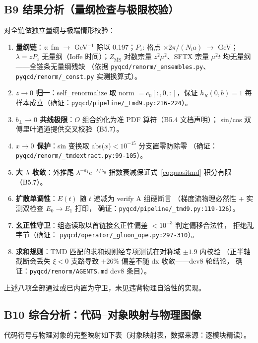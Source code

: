 \documentclass[UTF8]{ctexart}
\begin{document}
\subsection{B9 结果分析（量纲检查与极限校验）}
对全链做独立量纲与极端情形校验：
\begin{enumerate}
\item \textbf{量纲链}：$z$: fm $\to$ GeV$^{-1}$ 除以 0.197；$P_z$: 格点 $\times2\pi/(N_la)$
$\to$ GeV；$\lambda=zP_z$ 无量纲（Ioffe 时间）；$Z_{\overline{\mathrm{MS}}}$
对数宗量 $z^2\mu^2$、SFTX 宗量 $\mu^2t$ 均无量纲——全链条无量纲残缺
（依据 \texttt{\nolinkurl{pyqcd/renorm/_ensembles.py}}、
\texttt{\nolinkurl{pyqcd/renorm/_const.py}} 实测换算式）。
\item \textbf{$z\to0$ 归一}：self\_renormalize 取 norm $=c_0[:,0,:]$，保证
$h_R(0,b)=1$ 每样本成立（确证：\texttt{\nolinkurl{pyqcd/pipeline/_tmd9.py:216-224}}）。
\item \textbf{$b_\perp\to0$ 共线极限}：$O$ 组合约化为准 PDF 算符（B5.4 文档声明）；
sin/cos 双傅里叶通道提供交叉校验（B5.7）。
\item \textbf{$x\to0$ 保护}：sin 变换取 abs($x$)$<10^{-15}$ 分支置零防除零
（确证：\texttt{\nolinkurl{pyqcd/renorm/_tmdextract.py:99-105}}）。
\item \textbf{大 $\lambda$ 收敛}：外推尾 $\lambda^{-a_1}e^{-\lambda/\lambda_0}$
指数衰减保证式~\eqref{eq:quasitmd} 积分有限（B5.7）。
\item \textbf{扩散单调性}：$E(t)$ 随 $t$ 递减为 verify A 组硬断言
（梯度流物理必然性 + 实测双检查 $E_0\to E_1$ 打印，
确证：\texttt{\nolinkurl{pyqcd/pipeline/_tmd9.py:119-126}}）。
\item \textbf{幺正性守卫}：组态读取以首链接幺正性偏差 $<10^{-3}$ 判定偏移合法性，
拒绝乱字节（确证：
\texttt{\nolinkurl{pyqcd/operator/_gluon_ope.py:297-310}}）。
\item \textbf{求和规则}：TMD 匹配的求和规则经专项测试在对称域 $\pm1.9$ 内校验
（正半轴截断会丢失 $\xi<0$ 支路导致 $+26\%$ 偏差不随 dx 收敛——dev8 轮结论，
确证：\texttt{\nolinkurl{pyqcd/renorm/AGENTS.md}} dev8 条目）。
\end{enumerate}
上述八项全部通过或已内置为守卫，未见违背物理自洽性的实现。

\subsection{B10 综合分析：代码--对象映射与物理图像}
代码符号与物理对象的完整映射如下表（对象映射表，数据来源：逐模块精读）。
\end{document}
